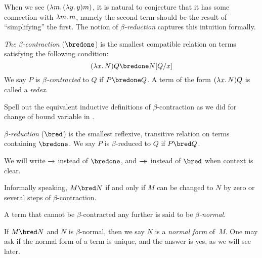 \documentclass[../../../include/open-logic-section]{subfiles}
\begin{document}

When we see $(\lambd[m][(\lambd[y][y]) m])$, it is natural to
conjecture that it has some connection with $\lambd[m][m]$, namely the
second term should be the result of ``simplifying'' the first.  The
notion of \emph{$\beta$-reduction} captures this intuition formally.

\begin{defn} 
  \emph{The $\beta$-contraction} ($\bredone$) is the smallest compatible
  relation on terms satisfying the following condition:
  \[
    (\lambd[x][N])Q \bredone \Subst{N}{Q}{x} 
  \]
  We say $P$ is \emph{$\beta$-contracted} to $Q$ if $P \bredone Q$.  A
  term of the form $(\lambd[x][N])Q$ is called a \emph{redex}.
\end{defn}

\begin{prob} 
  Spell out the equivalent inductive definitions of $\beta$-contraction as we
  did for change of bound variable in .
\end{prob}
  
\begin{defn} 
  \emph{$\beta$-reduction} ($\bred$) is the smallest reflexive,
  transitive relation on terms containing $\bredone$.  We say $P$ is
  $\beta$-reduced to $Q$ if $P \bred Q$.
\end{defn}

We will write $\redone$ instead of $\bredone$, and $\red$ instead of
$\bred$ when context is clear.

Informally speaking, $M \bred N$  if and only if $M$ can be changed to
$N$ by zero or several steps of $\beta$-contraction.

\begin{defn}
A term that cannot be $\beta$-contracted any further is said to be
\emph{$\beta$-normal}. 
\end{defn}

If $M \bred N$ and $N$ is $\beta$-normal, then we say $N$ is a
\emph{normal form} of~$M$. One may ask if the normal form of a term is
unique, and the answer is yes, as we will see later.
\end{document}
